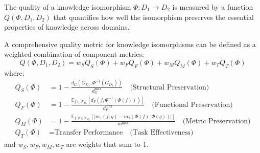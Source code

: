 \begin{definition}
The quality of a knowledge isomorphism $\Phi: D_1 \to D_2$ is measured by a function $Q(\Phi, D_1, D_2)$ that quantifies how well the isomorphism preserves the essential properties of knowledge across domains.
\end{definition}

\begin{theorem}
A comprehensive quality metric for knowledge isomorphisms can be defined as a weighted combination of component metrics:
\begin{equation}
Q(\Phi, D_1, D_2) = w_S Q_S(\Phi) + w_F Q_F(\Phi) + w_M Q_M(\Phi) + w_T Q_T(\Phi)
\end{equation}
where:
\begin{align}
Q_S(\Phi) &= 1 - \frac{d_G(G_{D_1}, \Phi^{-1}(G_{D_2}))}{d_G^{\max}} \quad \text{(Structural Preservation)} \\
Q_F(\Phi) &= 1 - \frac{\mathbb{E}_{f \in \mathcal{F}_{D_1}}[d_F(f, \Phi^{-1}(\Phi(f)))]}{d_F^{\max}} \quad \text{(Functional Preservation)} \\
Q_M(\Phi) &= 1 - \frac{\mathbb{E}_{f,g \in \mathcal{F}_{D_1}}[|m_1(f,g) - m_2(\Phi(f),\Phi(g))|]}{m^{\max}} \quad \text{(Metric Preservation)} \\
Q_T(\Phi) &= \text{Transfer Performance} \quad \text{(Task Effectiveness)}
\end{align}
and $w_S, w_F, w_M, w_T$ are weights that sum to 1.
\end{theorem}

